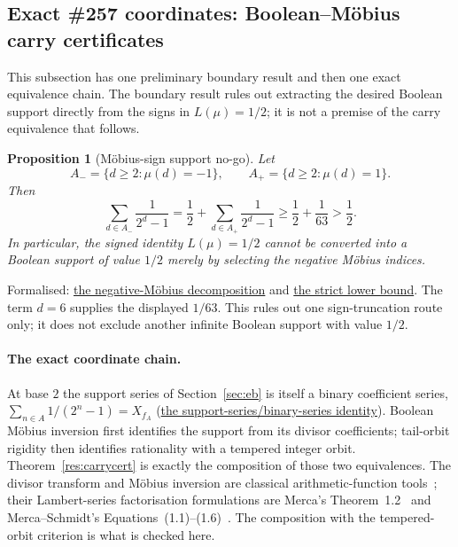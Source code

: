 \documentclass[11pt]{article}
\newcommand{\commit}{bb4e24651b37cd096d3749ef299c3317930b3a3b}
\newcommand{\repobase}{https://github.com/wcook04/plectis-lean-erdos249-257/blob/\commit}
\newcommand{\PK}{Erdos249257}
\newcommand{\lword}[4]{\href{\repobase/\PK/#1\#L#2}{#4}}
\newtheorem{proposition}[theorem]{Proposition}
\theoremstyle{definition}
\theoremstyle{remark}
\begin{document}
\subsection{Exact \#257 coordinates: Boolean--M\"obius carry certificates}
\label{app:carry-boolean}

This subsection has one preliminary boundary result and then one exact
equivalence chain.  The boundary result rules out extracting the desired
Boolean support directly from the signs in \(L(\mu)=1/2\); it is not a premise
of the carry equivalence that follows.

\begin{proposition}[M\"obius-sign support no-go]\label{res:mobiussignnogo}
Let
\[
 A_-=\{d\ge2:\mu(d)=-1\},
 \qquad A_+=\{d\ge2:\mu(d)=1\}.
\]
Then
\[
 \sum_{d\in A_-}\frac1{2^d-1}
 =\frac12+\sum_{d\in A_+}\frac1{2^d-1}
 \ge\frac12+\frac1{63}>\frac12.
\]
In particular, the signed identity \(L(\mu)=1/2\) cannot be converted into a
Boolean support of value \(1/2\) merely by selecting the negative M\"obius
indices.
\end{proposition}
\noindent Formalised:
\lword{MobiusSignSupportNoGo.lean}{111}{tsum_negativeMobius_eq_half_add_positiveMobiusTail}{the negative-M\"obius decomposition}
and
\lword{MobiusSignSupportNoGo.lean}{150}{half_add_one_div_sixty_three_le_tsum_negativeMobius}{the strict lower bound}.
The term \(d=6\) supplies the displayed \(1/63\).  This rules out one
sign-truncation route only; it does not exclude another infinite Boolean
support with value \(1/2\).

\paragraph{The exact coordinate chain.}
At base $2$ the support series of Section~\ref{sec:eb} is itself a binary
coefficient series, $\sum_{n\in A}1/(2^n-1)=X_{f_A}$
(\lword{BooleanMobiusCarry.lean}{377}{erdosSupportSeries_two_eq_binaryCoeffSeries}{the support-series/binary-series identity}).
Boolean M\"obius inversion first identifies the support from its divisor
coefficients; tail-orbit rigidity then identifies rationality with a tempered
integer orbit.  Theorem~\ref{res:carrycert} is exactly the composition of
those two equivalences.  The divisor transform and M\"obius inversion are
classical arithmetic-function tools~\cite[Thm.~2.9, p.~32]{apostol}; their
Lambert-series factorisation formulations are Merca's
Theorem~1.2~\cite[pp.~420--421]{merca2017} and Merca--Schmidt's
Equations~(1.1)--(1.6)~\cite[pp.~31--34]{mercaschmidt}.  The composition with the
tempered-orbit criterion is what is checked here.
\end{document}
